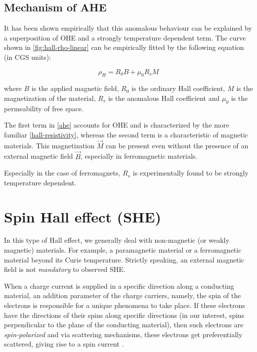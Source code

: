 \subsection{Mechanism of AHE}

It has been shown empirically that this anomalous behaviour can be explained by a superposition of OHE and a strongly temperature dependent term.
The curve shown in \cref{fig:hall-rho-linear}
can be empirically fitted by the following equation (in CGS units):

\begin{equation} \label{ahe}
    \rho_H = R_0 B + \mu_0 R_s M
\end{equation}

where $ B $ is the applied magnetic field, $ R_0 $ is the ordinary Hall coefficient, $ M $ is the magnetization of the material, $ R_s $ is the anomalous Hall coefficient and \( \mu_0 \) is the permeability of free space.

The first term in \cref{ahe} accounts for OHE and is characterized by the more familiar \cref{hall-resistivity}, whereas the second term is a characteristic of magnetic materials.
This magnetization $ \vec{M} $ can be present even without the presence of an external magnetic field $ \vec{B} $, especially in ferromagnetic materials.

Especially in the case of ferromagnets, $ R_s $ is experimentally found to be strongly temperature dependent.














\section{Spin Hall effect (SHE)} \label{sec:she}

In this type of Hall effect, we generally deal with non-magnetic (or weakly magnetic) materials.
For example, a paramagnetic material or a ferromagnetic material beyond its Curie temperature.
Strictly speaking, an external magnetic field is not \textit{mandatory} to observed SHE.

When a charge current is supplied in a specific direction along a conducting material, an addition parameter of the charge carriers, namely, the spin of the electrons is responsible for a unique phenomena to take place.
If these electrons have the directions of their spins along specific directions (in our interest, spins perpendicular to the plane of the conducting material), then such electrons are \textit{spin-polarized} and via scattering mechanisms\footnotemark, these electrons get preferentially scattered, giving rise to a spin current \cite{dyakonov1971current,hirsch1999spin}.

